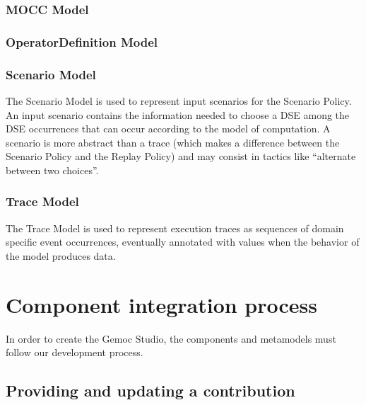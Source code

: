 \documentclass{gemoc} %
\begin{document}
\subsection{MOCC Model}


\subsection{OperatorDefinition Model}


\subsection{Scenario Model}
The Scenario Model is used to represent input scenarios for the Scenario Policy. An input scenario contains the information needed to choose a DSE among the DSE occurrences that can occur according to the model of computation. A scenario is more abstract than a trace (which makes a difference between the Scenario Policy and the Replay Policy) and may consist in tactics like ``alternate between two choices''.

\subsection{Trace Model}
The Trace Model is used to represent execution traces as sequences of domain specific event occurrences, eventually annotated with values when the behavior of the model produces data.


\chapter{Component integration process}
In  order to create the Gemoc Studio, the components and metamodels must follow our development process.

\section{Providing and updating a contribution}
\end{document}
